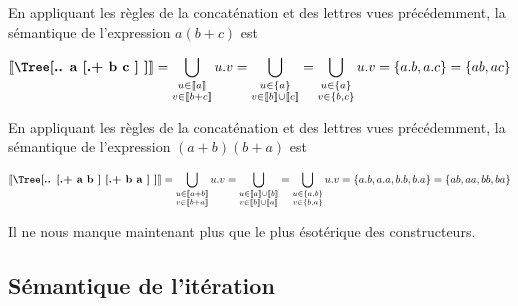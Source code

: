 \begin{example}
En appliquant les règles de la concaténation et des lettres vues précédemment, la sémantique de l'expression $a(b+c)$ est 

\[\mt{\Tree[.{.} a [.{+} b c ] ]} = \bigcup_{\substack{u \in \llbracket a \rrbracket \\ v \in \llbracket b + c \rrbracket }} u.v = \bigcup_{\substack{u \in \{a\} \\ v \in \llbracket b \rrbracket \cup \llbracket c \rrbracket}} = \bigcup_{\substack{u \in \{a\} \\ v \in \{b,c\} }} u.v = \{a.b, a.c\} = \{ab, ac\}\]
\end{example}

\begin{example}
En appliquant les règles de la concaténation et des lettres vues précédemment, la sémantique de l'expression $(a+b)(b+a)$ est 

\[\mt{\Tree[.{.} [.{+} a b ] [.{+} b a ] ]} = \bigcup_{\substack{u \in \llbracket a + b \rrbracket \\ v \in \llbracket b + a \rrbracket }} u.v = \bigcup_{\substack{u \in \llbracket a \rrbracket \cup \llbracket b \rrbracket \\ v \in \llbracket b \rrbracket \cup \llbracket a \rrbracket}} = \bigcup_{\substack{u \in \{a,b\} \\ v \in \{b,a\} }} u.v = \{a.b, a.a, b.b, b.a\} = \{ab, aa, bb, ba\}\]
\end{example}

Il ne nous manque maintenant plus que le plus ésotérique des constructeurs.

\subsection{Sémantique de l'itération}


